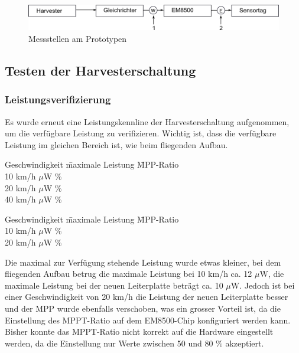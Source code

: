 \begin{figure}[ht]
  \includegraphics[width=1.0\textwidth]{3Vorgehen/imag/EnergiemessungStellen.png}               
  \caption{Messstellen am Prototypen}
  \label{EnergieMessungStellen} 
\end{figure}


\subsection{Testen der Harvesterschaltung}

\subsubsection{Leistungsverifizierung}

Es wurde erneut eine Leistungskennline der Harvesterschaltung aufgenommen, um die verfügbare Leistung zu verifizieren. Wichtig ist, dass die verfügbare Leistung im gleichen Bereich ist, wie beim fliegenden Aufbau. 

\label{tab:leistung_fliegenden-aufbaus} 
\begin{tabbing}
    Geschwindigkeit   \quad\= maximale Leistung    \quad\= MPP-Ratio\\[0.8ex]
    10 km/h         $\mu$W   \%\\
	20 km/h         $\mu$W   \%\\
	40 km/h         $\mu$W   \%
\end{tabbing}

\label{tab:leistung_neuen_leiterplatte} 
\begin{tabbing}
    Geschwindigkeit   \quad\= maximale Leistung    \quad\= MPP-Ratio\\[0.8ex]
    10 km/h         $\mu$W   \%\\
	20 km/h         $\mu$W   \%
\end{tabbing}

Die maximal zur Verfügung stehende Leistung wurde etwas kleiner, bei dem fliegenden Aufbau betrug die maximale Leistung bei 10 km/h ca. 12 $\mu$W, die maximale Leistung bei der neuen Leiterplatte beträgt ca. 10 $\mu$W. Jedoch ist bei einer Geschwindigkeit von 20 km/h die Leistung der neuen Leiterplatte besser und der MPP wurde ebenfalls verschoben, was ein grosser Vorteil ist, da die Einstellung des MPPT-Ratio auf dem EM8500-Chip konfiguriert werden kann. Bisher konnte das MPPT-Ratio nicht korrekt auf die Hardware eingestellt werden, da die Einstellung nur Werte zwischen 50 und 80 \% akzeptiert.

